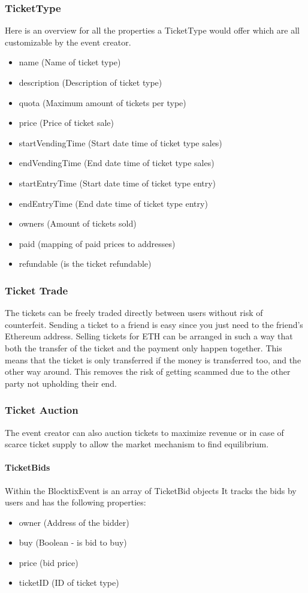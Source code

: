 \documentclass[a4paper]{article}
\begin{document}
\subsubsection{TicketType}
Here is an overview for all the properties a TicketType would offer which are all customizable by the event creator.
\begin{itemize}
\item name (Name of ticket type)
\item description (Description of ticket type)
\item quota (Maximum amount of tickets per type)
\item price (Price of ticket sale)
\item startVendingTime (Start date time of ticket type sales)
\item endVendingTime (End date time of ticket type sales)
\item startEntryTime (Start date time of ticket type entry)
\item endEntryTime (End date time of ticket type entry)
\item owners (Amount of tickets sold)
\item paid (mapping of paid prices to addresses)
\item refundable (is the ticket refundable)
\end{itemize}


\subsubsection{Ticket Trade}
The tickets can be freely traded directly between users without risk of counterfeit. Sending a ticket to a friend is easy since you just need to the friend's Ethereum address. Selling tickets for ETH can be arranged in such a way that both the transfer of the ticket and the payment only happen together. This means that the ticket is only transferred if the money is transferred too, and the other way around. This removes the risk of getting scammed due to the other party not upholding their end.

\subsubsection{Ticket Auction}
The event creator can also auction tickets to maximize revenue or in case of scarce ticket supply to allow the market mechanism to find equilibrium. 

\paragraph{TicketBids} 
Within the BlocktixEvent is an array of TicketBid objects It tracks the bids by users and has the following properties:
\begin{itemize}
\item owner (Address of the bidder)
\item buy (Boolean - is bid to buy)
\item price (bid price)
\item ticketID (ID of ticket type)
\end{itemize}
\end{document}
